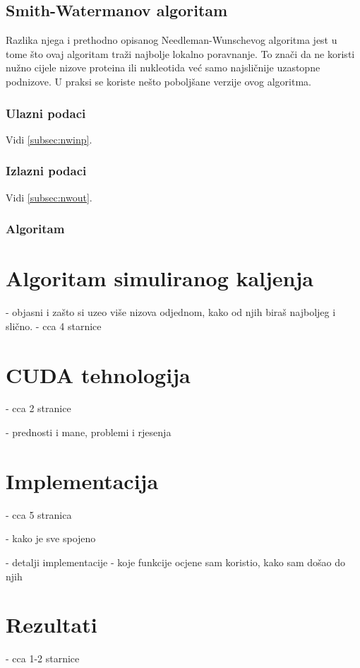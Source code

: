 \documentclass[times, utf8, zavrsni]{fer}
\begin{document}
\section{Smith-Watermanov algoritam}
\label{sec:swalg}
Razlika njega i prethodno opisanog Needleman-Wunschevog algoritma jest u tome
što ovaj algoritam traži najbolje lokalno poravnanje. To znači da ne koristi
nužno cijele nizove proteina ili nukleotida već samo najsličnije uzastopne
podnizove. U praksi se koriste nešto poboljšane verzije ovog algoritma.

\subsection{Ulazni podaci}
Vidi \autoref{subsec:nwinp}.

\subsection{Izlazni podaci}
Vidi \autoref{subsec:nwout}.

\subsection{Algoritam}
\label{subsec:swalg}


\chapter{Algoritam simuliranog kaljenja}
- objasni i zašto si uzeo više nizova odjednom, kako od njih biraš najboljeg i slično.
- cca 4 starnice

\chapter{CUDA tehnologija}
- cca 2 stranice

- prednosti i mane, problemi i rjesenja

\chapter{Implementacija}
- cca 5 stranica

- kako je sve spojeno

- detalji implementacije - koje funkcije ocjene sam koristio, kako sam došao do njih

\chapter{Rezultati}
- cca 1-2 starnice
\end{document}
